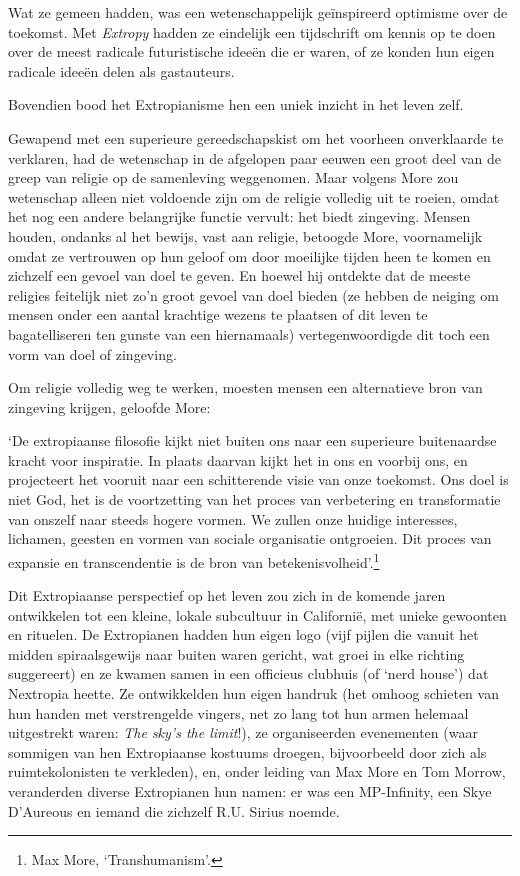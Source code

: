 \documentclass[
  a5paper,
  smalldemyvopaper,11pt,twoside,onecolumn,openright,extrafontsizes]{memoir}
\begin{document}
Wat ze gemeen hadden, was een wetenschappelijk geïnspireerd optimisme
over de toekomst. Met \emph{Extropy} hadden ze eindelijk een tijdschrift
om kennis op te doen over de meest radicale futuristische ideeën die er
waren, of ze konden hun eigen radicale ideeën delen als gastauteurs.

Bovendien bood het Extropianisme hen een uniek inzicht in het leven
zelf.

Gewapend met een superieure gereedschapskist om het voorheen
onverklaarde te verklaren, had de wetenschap in de afgelopen paar eeuwen
een groot deel van de greep van religie op de samenleving weggenomen.
Maar volgens More zou wetenschap alleen niet voldoende zijn om de
religie volledig uit te roeien, omdat het nog een andere belangrijke
functie vervult: het biedt zingeving. Mensen houden, ondanks al het
bewijs, vast aan religie, betoogde More, voornamelijk omdat ze
vertrouwen op hun geloof om door moeilijke tijden heen te komen en
zichzelf een gevoel van doel te geven. En hoewel hij ontdekte dat de
meeste religies feitelijk niet zo'n groot gevoel van doel bieden (ze
hebben de neiging om mensen onder een aantal krachtige wezens te
plaatsen of dit leven te bagatelliseren ten gunste van een hiernamaals)
vertegenwoordigde dit toch een vorm van doel of zingeving.

Om religie volledig weg te werken, moesten mensen een alternatieve bron
van zingeving krijgen, geloofde More:

`De extropiaanse filosofie kijkt niet buiten ons naar een superieure
buitenaardse kracht voor inspiratie. In plaats daarvan kijkt het in ons
en voorbij ons, en projecteert het vooruit naar een schitterende visie
van onze toekomst. Ons doel is niet God, het is de voortzetting van het
proces van verbetering en transformatie van onszelf naar steeds hogere
vormen. We zullen onze huidige interesses, lichamen, geesten en vormen
van sociale organisatie ontgroeien. Dit proces van expansie en
transcendentie is de bron van betekenisvolheid'.\footnote{Max More,
  `Transhumanism'.}

Dit Extropiaanse perspectief op het leven zou zich in de komende jaren
ontwikkelen tot een kleine, lokale subcultuur in Californië, met unieke
gewoonten en rituelen. De Extropianen hadden hun eigen logo (vijf pijlen
die vanuit het midden spiraalsgewijs naar buiten waren gericht, wat
groei in elke richting suggereert) en ze kwamen samen in een officieus
clubhuis (of `nerd house') dat Nextropia heette. Ze ontwikkelden hun
eigen handruk (het omhoog schieten van hun handen met verstrengelde
vingers, net zo lang tot hun armen helemaal uitgestrekt waren: \emph{The
sky's the limit}!), ze organiseerden evenementen (waar sommigen van hen
Extropiaanse kostuums droegen, bijvoorbeeld door zich als
ruimtekolonisten te verkleden), en, onder leiding van Max More en Tom
Morrow, veranderden diverse Extropianen hun namen: er was een
MP-Infinity, een Skye D'Aureous en iemand die zichzelf R.U. Sirius
noemde.
\end{document}
